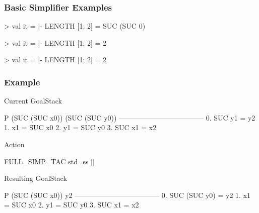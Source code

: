 \begin{frame}[fragile]
\frametitle{Basic Simplifier Examples}

\begin{semiverbatim}\scriptsize
>  
val it = |- LENGTH [1; 2] = SUC (SUC 0)

>  
val it = |- LENGTH [1; 2] = 2

>  
val it = |- LENGTH [1; 2] = 2
\end{semiverbatim}
\end{frame}

\begin{frame}[fragile]
\frametitle{ Example}

\begin{exampleblock}{Current GoalStack}
\begin{semiverbatim}\scriptsize
P (SUC (SUC x0)) (SUC (SUC y0))
------------------------------------
  0.  SUC y1 = y2
  1.  x1 = SUC x0
  2.  y1 = SUC y0
  3.  SUC x1 = x2
\end{semiverbatim}
\end{exampleblock}

\begin{exampleblock}{Action}
\begin{semiverbatim}\scriptsize
FULL_SIMP_TAC std_ss [] 
\end{semiverbatim}
\end{exampleblock}
 
\begin{exampleblock}{Resulting GoalStack}
\begin{semiverbatim}\scriptsize
P (SUC (SUC x0)) y2
------------------------------------
  0.  SUC (SUC y0) = y2
  1.  x1 = SUC x0
  2.  y1 = SUC y0
  3.  SUC x1 = x2
\end{semiverbatim}
\end{exampleblock}
\end{frame}


